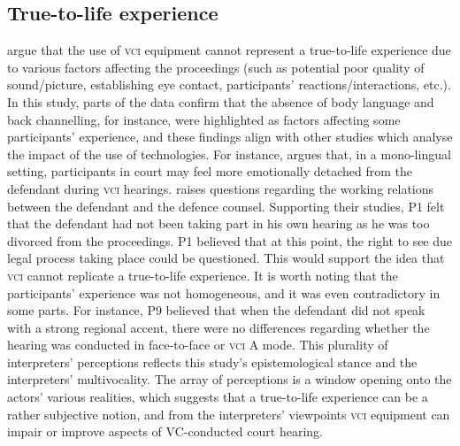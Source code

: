 \documentclass[output=paper]{langsci/langscibook}
\begin{document}
\subsection{True-to-life experience}

\citet{vanRotterdam2011} argue that the use of \textsc{vci} equipment cannot represent a true-to-life experience due to various factors affecting the proceedings (such as potential poor quality of sound/picture, establishing eye contact, participants’ reactions/interactions, etc.). In this study, parts of the data confirm that the absence of body language and back channelling, for instance, were highlighted as factors affecting some participants’ experience, and these findings align with other studies which analyse the impact of the use of technologies. For instance, \citet{Radburn-Remfry1994} argues that, in a mono-lingual setting, participants in court may feel more emotionally detached from the defendant during \textsc{vci} hearings. \citet{Hodges2008} raises questions regarding the working relations between the defendant and the defence counsel. Supporting their studies, P1 felt that the defendant had not been taking part in his own hearing as he was too divorced from the proceedings. P1 believed that at this point, the right to see due legal process taking place could be questioned. This would support the idea that \textsc{vci} cannot replicate a true-to-life experience. It is worth noting that the participants’ experience was not homogeneous, and it was even contradictory in some parts. For instance, P9 believed that when the defendant did not speak with a strong regional accent, there were no differences regarding whether the hearing was conducted in face-to-face or \textsc{vci} A mode. This plurality of interpreters’ perceptions reflects this study’s epistemological stance and the interpreters’ multivocality. The array of perceptions is a window opening onto the actors’ various realities, which suggests that a true-to-life experience can be a rather subjective notion, and from the interpreters’ viewpoints \textsc{vci} equipment can impair or improve aspects of VC-conducted court hearing.
\end{document}
